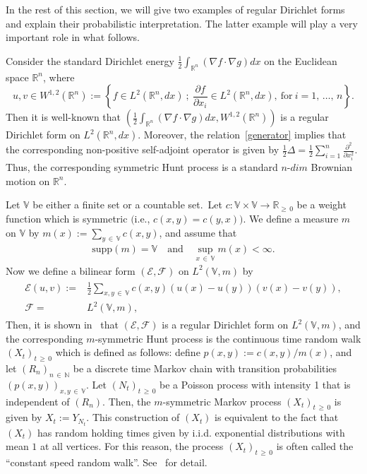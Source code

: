 \documentclass[AHL,Unicode,longabstracts,published]{cedram}
\newcommand{\ce}{\mathcal{E}}
\newcommand{\cf}{\mathcal{F}}
\newcommand{\br}{\mathbb{R}}
\newcommand{\bn}{\mathbb{N}}
\newcommand{\bv}{\mathbb{V}}
\newcommand{\supp}{\mathrm{supp}}
\begin{document}
In the rest of this section, we will give two examples of regular Dirichlet forms and explain their probabilistic interpretation. The latter example will play a very important role in what follows.
\begin{exem}
Consider the standard Dirichlet energy $\frac{1}{2}\int_{\br^n}(\nabla f\cdot\nabla g)dx$ on the Euclidean space $\br^n$, where 
\[
u,v\in W^{1,2}\left(\br^n\right):=\left\{f\in L^2\left(\br^n,dx\right)\ ;\
\frac{\partial f}{\partial x_i}\in L^2\left(\br^n,dx\right),\ \text{for}\ i=1,\,\dots,\,n\right\}.
\]
Then it is well-known that $(\frac{1}{2}\int_{\br^n}(\nabla f\cdot\nabla g)dx,W^{1,2}(\br^n))$ is a regular Dirichlet form on $L^2(\br^n,dx)$. Moreover, the relation~\eqref{generator} implies that the corresponding non-positive self-adjoint operator is given by $\frac{1}{2}\Delta=\frac{1}{2}\sum_{i=1}^n\frac{\partial^2}{\partial x_i^2}$. Thus, the corresponding symmetric Hunt process is a standard $n$-$dim$ Brownian motion on $\br^n$.
\end{exem}

\begin{exem}\label{csrw}
Let $\bv$ be either a finite set or a countable set.\ Let $c:\bv\times\bv\to\br_{\geq\,0}$ be a weight function which is symmetric $($i.e., $c(x,y)=c(y,x))$. We define a measure $m$ on $\bv$ by $m(x):=\sum_{y\,\in\,\bv}c(x,y)$, and assume that
\begin{align}\label{assume-m}
\supp(m)=\bv\quad \text{and}\quad \sup_{x\,\in\,\bv}m(x)<\infty.
\end{align}
Now we define a bilinear form $(\ce,\cf)$ on $L^2(\bv,m)$ by
\begin{align}\label{srw}
\begin{split}
\ce(u,v){:=}&\frac{1}{2}\sum_{x,y\,\in\,\bv}c(x,y)(u(x)-u(y))(v(x)-v(y)), \\
\cf=& L^2(\bv,m),
\end{split}
\end{align}
Then, it is shown in~\cite[Theorem~2.2.2]{CF} that $(\ce,\cf)$ is a regular Dirichlet form on $L^2(\bv,m)$, and the corresponding $m$-symmetric Hunt process is the continuous time random walk $(X_t)_{t\,\geq\,0}$ which is defined as follows: define $p(x,y):=c(x,y)/m(x)$, and let $(R_n)_{n\,\in\,\bn}$ be a discrete time Markov chain with transition probabilities $(p(x,y))_{x,y\,\in\,\bv}$. Let $(N_t)_{t\,\geq\,0}$ be a Poisson process with intensity 1 that is independent of $(R_n)$. Then, the $m$-symmetric Markov process $(X_t)_{t\,\geq\,0}$ is given by $X_t:=Y_{N_t}$. This construction of $(X_t)$ is equivalent to the fact that $(X_t)$ has random holding times given by i.i.d. exponential distributions with mean $1$ at all vertices. For this reason, the process $(X_t)_{t\,\geq\,0}$ is often called the ``constant speed random walk''. See~\cite[Section~2.2.1]{CF} for detail.
\end{exem}
\end{document}
